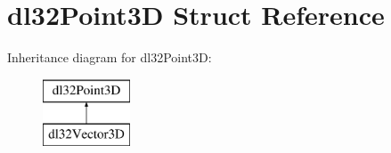 \hypertarget{structdl32_point3_d}{\section{dl32\-Point3\-D Struct Reference}
\label{structdl32_point3_d}
}
Inheritance diagram for dl32\-Point3\-D\-:\begin{figure}[H]
\begin{center}
\leavevmode
\includegraphics[height=2.000000cm]{structdl32_point3_d}
\end{center}
\end{figure}

